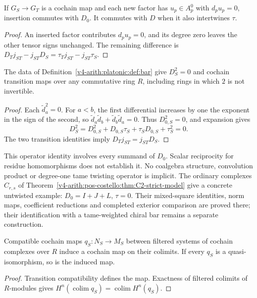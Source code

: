 \begin{lemma}
\label{v4-arith:platonic:lem:closed-units}
If \(G_S\to G_T\) is a cochain map and each new factor has
\(u_p\in A_p^0\) with \(d_pu_p=0\), insertion commutes with \(D_0\).
It commutes with \(D\) when it also intertwines \(\tau\).
\end{lemma}
\begin{proof}
An inserted factor contributes \(d_pu_p=0\), and its degree zero
leaves the other tensor signs unchanged. The remaining difference is
\(D_Tj_{ST}-j_{ST}D_S=\tau_Tj_{ST}-j_{ST}\tau_S\).
\end{proof}

\begin{proposition}
\label{v4-arith:platonic:prop:finite-stage-strictification}
The data of Definition~\ref{v4-arith:platonic:def:bar} give
\(D_S^2=0\) and cochain transition maps over any commutative ring \(R\),
including rings in which \(2\) is not invertible.
\end{proposition}
\begin{proof}
Each \(\widetilde d_a^2=0\). For \(a<b\), the first differential
increases by one the exponent in the sign of the second, so
\(\widetilde d_a\widetilde d_b+\widetilde d_b\widetilde d_a=0\).
Thus \(D_{0,S}^2=0\), and expansion gives
\[
D_S^2=D_{0,S}^2+D_{0,S}\tau_S+\tau_SD_{0,S}+\tau_S^2=0.
\]
The two transition identities imply \(D_Tj_{ST}=j_{ST}D_S\).
\end{proof}

This operator identity involves every summand of \(D_0\).
Scalar reciprocity for residue homomorphisms does not establish it.
No coalgebra structure, convolution product or degree-one tame twisting
operator is implicit. The ordinary complexes \(C_{r,s}\) of
Theorem~\ref{v4-arith:pos-costello:thm:C2-strict-model} give a concrete
untwisted example: \(D_0=I+J+L\), \(\tau=0\). Their mixed-square
identities, norm maps, coefficient reductions and completed exterior
comparison are proved there; their identification with a tame-weighted
chiral bar remains a separate construction.

\begin{proposition}
\label{v4-arith:platonic:prop:bar-comparison}
Compatible cochain maps \(q_S:N_S\to M_S\) between filtered systems
of cochain complexes over \(R\) induce a cochain map on their colimits.
If every \(q_S\) is a quasi-isomorphism, so is the induced map.
\end{proposition}
\begin{proof}
Transition compatibility defines the map. Exactness of filtered colimits
of \(R\)-modules gives
\(H^n(\operatorname{colim}q_S)=\operatorname{colim}H^n(q_S)\).
\end{proof}

